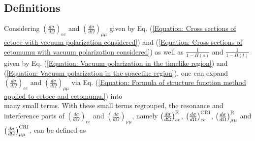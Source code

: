 \documentclass[a4paper,10pt,twoside]{cpc-hepnp}
\begin{document}
\begin{CJK*}{UTF8}{gbsn}
\begin{multicols}{2}
\subsection{Definitions}

Considering $\left(\frac{d\bar{\sigma}}{d\Omega}\right)_{ee}$ and $\left(\frac{d\bar{\sigma}}{d\Omega}\right)_{\mu\mu}$ given by Eq. (\ref{Equation: Cross sections of eetoee with vacuum polarization considered}) and (\ref{Equation: Cross sections of eetomumu with vacuum polarization considered}) as well as $\frac{1}{1-\Pi(s)}$ and $\frac{1}{1-\Pi(t)}$ given by Eq. (\ref{Equation: Vacuum polarization in the timelike region}) and (\ref{Equation: Vacuum polarization in the spacelike region}), one can expand $\left(\frac{d\sigma}{d\Omega}\right)_{ee}$ and $\left(\frac{d\sigma}{d\Omega}\right)_{\mu\mu}$ via Eq. (\ref{Equation: Formula of structure function method applied to eetoee and eetomumu.}) into \\ many small terms. With these small terms regrouped, the resonance and interference parts of $\left(\frac{d\sigma}{d\Omega}\right)_{ee}$ and $\left(\frac{d\sigma}{d\Omega}\right)_{\mu\mu}$, namely $\left(\frac{d\sigma}{d\Omega}\right)_{ee}^{\rm R}$, $\left(\frac{d\sigma}{d\Omega}\right)_{ee}^{\rm CRI}$, $\left(\frac{d\sigma}{d\Omega}\right)_{\mu\mu}^{\rm R}$ and $\left(\frac{d\sigma}{d\Omega}\right)_{\mu\mu}^{\rm CRI}$, can be defined as

\end{multicols}


\end{CJK*}
\end{document}
